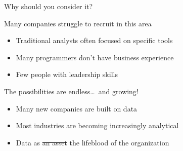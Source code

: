 \begin{frame}{Why should you consider it?}
    \vspace{1em}
    \begin{block}{Many companies struggle to recruit in this area}
        \begin{itemize}
            \item Traditional analysts often focused on specific tools
            \item Many programmers don't have business experience
            \item Few people with leadership skills
        \end{itemize}
    \end{block}
    \vfill
    \begin{block}{The possibilities are endless\ldots~and growing!}
        \begin{itemize}
            \item Many new companies are built on data
            \item Most industries are becoming increasingly analytical
            \item Data as \sout{an asset} the lifeblood of the organization
        \end{itemize}
    \end{block}
\end{frame}


